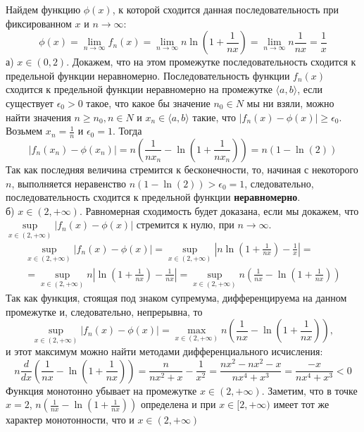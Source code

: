 \documentclass[a5paper, 10pt]{article}
\theoremstyle{definition}
\theoremstyle{plain}
\theoremstyle{remark}
\begin{document}
Найдем функцию $\phi(x)$, к которой сходится данная последовательность при фиксированном $x$ и $n \to \infty$:
\begin{equation}
\phi(x) = \lim_{n \to \infty} f_n (x) = \lim_{n \to \infty} n \ln \left( 1+ \frac{1}{nx} \right) =
\lim_{n \to \infty} n  \frac{1}{nx} = \frac{1}{x}
\end{equation}
а)  $x \in (0, 2)$. Докажем, что на этом промежутке последовательность сходится к предельной функции неравномерно. Последовательность функции $f_n (x)$ сходится к предельной функции неравномерно на промежутке $\langle a, b \rangle$, если существует $\epsilon_0 > 0$ такое, что какое бы значение $n_0 \in N$ мы ни взяли, можно найти значения $n \geq n_0, n \in N$ и $x_n \in \langle a, b \rangle$ такие, что $\left| f_n (x) - \phi(x)  \right| \geq \epsilon_0$. \\
Возьмем $x_n = \frac{1}{n}$ и $\epsilon_0 = 1$. Тогда
\begin{equation*}
\left| f_n (x_n) - \phi(x_n)  \right| = n \left( \frac{1}{nx_n}- \ln \left( 1+ \frac{1}{nx_n} \right)  \right) =  
 n \left( 1- \ln \left( 2 \right)  \right)
\end{equation*}
Так как последняя величина стремится к бесконечности, то, начиная с некоторого $n$, выполняется неравенство $ n \left( 1- \ln \left( 2 \right)  \right) > \epsilon_0 = 1$, следовательно, последовательность сходится к предельной функции \textbf{неравномерно}.\\

б)  $x \in (2, + \infty)$. Равномерная сходимость будет доказана, если мы докажем, что $\sup \limits_{x \in (2, + \infty)} \left| f_n (x) - \phi(x)  \right| $ стремится к нулю, при $n \to \infty$.
\begin{multline}
\sup \limits_{x \in (2, + \infty) } \left| f_n (x) - \phi(x)  \right| = \sup \limits_{x \in (2, + \infty) } \left| n \ln \left( 1+ \frac{1}{nx} \right) - \frac{1}{x}  \right| =\\ = \sup \limits_{x \in (2, + \infty) }  n \left| \ln \left( 1+ \frac{1}{nx} \right) - \frac{1}{nx} \right| 
= \sup \limits_{x \in (2, + \infty) }  n \left( \frac{1}{nx}- \ln \left( 1+ \frac{1}{nx} \right)  \right)
\end{multline}
Так как функция, стоящая под знаком супремума, дифференцируема на данном промежутке и, следовательно, непрерывна, то
\begin{equation*}
\sup \limits_{x \in (2, + \infty) } \left| f_n (x) - \phi(x)  \right| = \max \limits_{x \in (2, + \infty) }  n \left( \frac{1}{nx}- \ln \left( 1+ \frac{1}{nx} \right)  \right),
\end{equation*}
и этот максимум можно найти методами дифференциального исчисления:
\begin{equation*}
n \frac{d}{dx} \left(  \frac{1}{nx}- \ln \left( 1+ \frac{1}{nx} \right)  \right) = \frac{n}{nx^2+x}-\frac{1}{x^2} = 
\frac{nx^2-nx^2-x}{nx^4+x^3} = \frac{-x}{nx^4+x^3} < 0
\end{equation*}
Функция монотонно убывает на промежутке  $x \in (2, + \infty)$. Заметим, что в точке $x = 2$,  $n \left( \frac{1}{nx}- \ln \left( 1+ \frac{1}{nx} \right)  \right)$ определена и при $x \in [2, + \infty)$ имеет тот же характер монотонности, что и $x \in (2, + \infty)$
\end{document}
